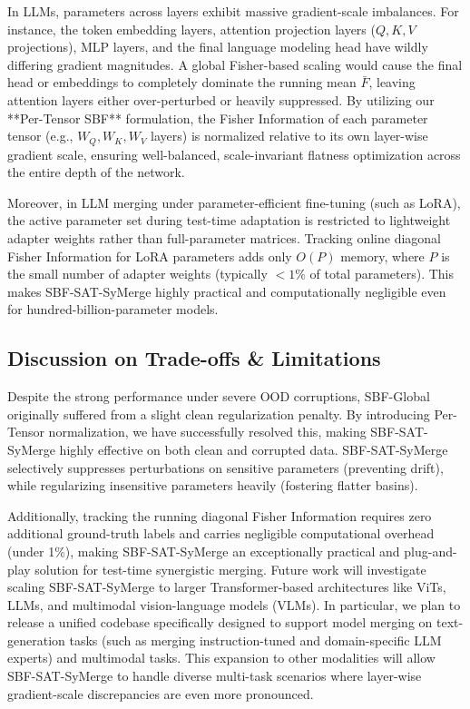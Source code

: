 \documentclass{article}
\theoremstyle{plain}
\theoremstyle{definition}
\theoremstyle{remark}
\begin{document}
In LLMs, parameters across layers exhibit massive gradient-scale imbalances. For instance, the token embedding layers, attention projection layers ($Q, K, V$ projections), MLP layers, and the final language modeling head have wildly differing gradient magnitudes. A global Fisher-based scaling would cause the final head or embeddings to completely dominate the running mean $\bar{F}$, leaving attention layers either over-perturbed or heavily suppressed. By utilizing our **Per-Tensor SBF** formulation, the Fisher Information of each parameter tensor (e.g., $W_Q, W_K, W_V$ layers) is normalized relative to its own layer-wise gradient scale, ensuring well-balanced, scale-invariant flatness optimization across the entire depth of the network.

Moreover, in LLM merging under parameter-efficient fine-tuning (such as LoRA), the active parameter set during test-time adaptation is restricted to lightweight adapter weights rather than full-parameter matrices. Tracking online diagonal Fisher Information for LoRA parameters adds only $O(P)$ memory, where $P$ is the small number of adapter weights (typically $<1\%$ of total parameters). This makes SBF-SAT-SyMerge highly practical and computationally negligible even for hundred-billion-parameter models.

\subsection{Discussion on Trade-offs \& Limitations}
Despite the strong performance under severe OOD corruptions, SBF-Global originally suffered from a slight clean regularization penalty. By introducing Per-Tensor normalization, we have successfully resolved this, making SBF-SAT-SyMerge highly effective on both clean and corrupted data. SBF-SAT-SyMerge selectively suppresses perturbations on sensitive parameters (preventing drift), while regularizing insensitive parameters heavily (fostering flatter basins).

Additionally, tracking the running diagonal Fisher Information requires zero additional ground-truth labels and carries negligible computational overhead (under 1\%), making SBF-SAT-SyMerge an exceptionally practical and plug-and-play solution for test-time synergistic merging. Future work will investigate scaling SBF-SAT-SyMerge to larger Transformer-based architectures like ViTs, LLMs, and multimodal vision-language models (VLMs). In particular, we plan to release a unified codebase specifically designed to support model merging on text-generation tasks (such as merging instruction-tuned and domain-specific LLM experts) and multimodal tasks. This expansion to other modalities will allow SBF-SAT-SyMerge to handle diverse multi-task scenarios where layer-wise gradient-scale discrepancies are even more pronounced.
\end{document}
